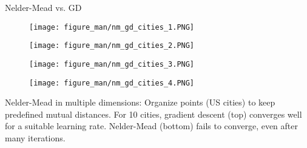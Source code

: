 \documentclass[11pt,compress,t,notes=noshow, xcolor=table]{beamer}
\begin{document}
\begin{vbframe}{Nelder-Mead vs. GD}
\vspace*{-0.5cm}
\begin{figure}
    \centering
    \begin{minipage}{0.45\textwidth}
        \centering
        \texttt{[image: figure\_man/nm\_gd\_cities\_1.PNG]}
    \end{minipage}\hfill
    \begin{minipage}{0.45\textwidth}
        \centering
        \texttt{[image: figure\_man/nm\_gd\_cities\_2.PNG]}
    \end{minipage}
\end{figure}
\begin{figure}
    \centering
    \begin{minipage}{0.45\textwidth}
        \centering
        \texttt{[image: figure\_man/nm\_gd\_cities\_3.PNG]}
    \end{minipage}\hfill
    \begin{minipage}{0.45\textwidth}
        \centering
        \texttt{[image: figure\_man/nm\_gd\_cities\_4.PNG]}
    \end{minipage}
\end{figure}

\begin{footnotesize}
    Nelder-Mead in multiple dimensions:
    Organize points (US cities) to keep predefined mutual distances.
    For 10 cities, gradient descent (top) converges well for a suitable learning rate.
    Nelder-Mead (bottom) fails to converge, even after many iterations.
\end{footnotesize}



\end{vbframe}
\end{document}
